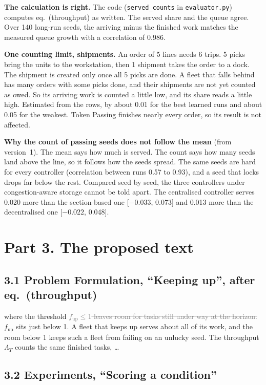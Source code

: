 \documentclass[11pt,a4paper]{article}
\newcommand{\new}[1]{\textcolor{newc}{#1}}
\newcommand{\old}[1]{\textcolor{gray}{\sout{#1}}}
\begin{document}
\textbf{The calculation is right.} The code (\texttt{served\_counts} in
\texttt{evaluator.py}) computes eq.~(throughput) as written. The served
share and the queue agree. Over 140 long-run seeds, the arriving minus the
finished work matches the measured queue growth with a correlation of 0.986.

\textbf{One counting limit, shipments.} An order of 5 lines needs 6 trips.
5 picks bring the units to the workstation, then 1 shipment takes the order
to a dock. The shipment is created only once all 5 picks are done. A fleet
that falls behind has many orders with some picks done, and their shipments
are not yet counted as owed. So its arriving work is counted a little low,
and its share reads a little high. Estimated from the rows, by about 0.01
for the best learned runs and about 0.05 for the weakest. Token Passing
finishes nearly every order, so its result is not affected.

\textbf{Why the count of passing seeds does not follow the mean} (from
version~1). The mean says how much is served. The count says how many seeds
land above the line, so it follows how the seeds spread. The same seeds are
hard for every controller (correlation between runs 0.57 to 0.93), and a
seed that locks drops far below the rest. Compared seed by seed, the three
controllers under congestion-aware storage cannot be told apart. The
centralised controller serves 0.020 more than the section-based one
[$-0.033$, 0.073] and 0.013 more than the decentralised one
[$-0.022$, 0.048].

\section*{Part 3. The proposed text}

\subsection*{3.1 Problem Formulation, ``Keeping up'', after eq.~(throughput)}

where the threshold \old{$f_{\mathrm{up}} \le 1$ leaves room for tasks
still under way at the horizon.}\new{$f_{\mathrm{up}}$ sits just below 1.
A fleet that keeps up serves about all of its work, and the room below 1
keeps such a fleet from failing on an unlucky seed.} The throughput
$\Lambda_T$ counts the same finished tasks, \dots

\subsection*{3.2 Experiments, ``Scoring a condition''}
\end{document}
